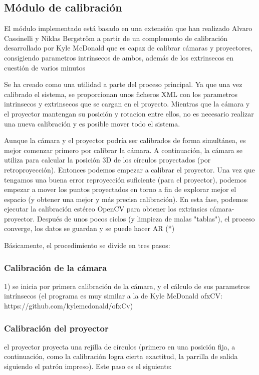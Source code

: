 \subsection{Módulo de calibración}
El módulo implementado está basado en una extensión que han realizado Alvaro Cassinelli y Niklas Bergström a partir de un complemento de calibración desarrollado por Kyle McDonald que es capaz de calibrar cámaras y proyectores, consigiendo parametros intrínsecos de ambos, además de los extrinsecos en cuestión de varios minutos 

Se ha creado como una utilidad a parte del proceso principal. Ya que una vez calibrado el sistema, se proporcionan unos ficheros XML con los parametros intrinsecos y extrinsecos que se cargan en el proyecto. Mientras que la cámara y el proyector mantengan su posición y rotacion entre ellos, no es necesario realizar una nueva calibración y es posible mover todo el sistema.

Aunque la cámara y el proyector podría ser calibrados de forma simultánea, es mejor comenzar primero por calibrar la cámara. A continuación, la cámara se utiliza para calcular la posición 3D de los círculos proyectados (por retroproyección). Entonces podemos empezar a calibrar el proyector. Una vez que tengamos una buena error reproyección suficiente (para el proyector), podemos empezar a mover los puntos proyectados en torno a fin de explorar mejor el espacio (y obtener una mejor y más precisa calibración). En esta fase, podemos ejecutar la calibración estéreo OpenCV para obtener los extrinsics cámara-proyector. Después de unos pocos ciclos (y limpieza de malas "tablas"), el proceso converge, los datos se guardan y se puede hacer AR (*) 

Básicamente, el procedimiento se divide en tres pasos: 

\subsubsection{Calibración de la cámara}

1) se inicia por primera calibración de la cámara, y el cálculo de sus parametros intrínsecos (el programa es muy similar a la de Kyle McDonald ofxCV: https://github.com/kylemcdonald/ofxCv) 

\subsubsection{Calibración del proyector}
el proyector proyecta una rejilla de círculos (primero en una posición fija, a continuación, como la calibración logra cierta exactitud, la parrilla de salida siguiendo el patrón impreso). Este paso es el siguiente: 

